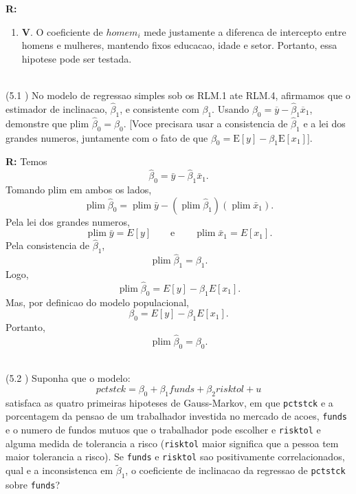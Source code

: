 \documentclass[12pt,letterpaper, onecolumn]{exam}
\DeclareMathOperator*{\plim}{plim}
\renewenvironment{solution}
  {\par\noindent\textbf{R:}\enspace\color{blue}}
  {\par\color{black}}
\begin{document}
\begin{questions}
\begin{solution}
\begin{enumerate}[label=(\arabic*)]
    \item \textbf{V}. O coeficiente de \(homem_i\) mede justamente a diferenca de intercepto entre homens e mulheres, mantendo fixos educacao, idade e setor. Portanto, essa hipotese pode ser testada.
\end{enumerate}
\end{solution}

\
\\

\question\qstar (5.1 \citep{wooldridge2016}) No modelo de regressao simples sob os RLM.1 ate RLM.4, afirmamos que o estimador de inclinacao, $\hat\beta_1$, e consistente com $\beta_1$. Usando $\beta_0 = \overline y - \hat\beta_1\overline x_1$, demonstre que plim $\hat\beta_0 = \beta_0$. [Voce precisara usar a consistencia de $\hat\beta_1$ e a lei dos grandes numeros, juntamente com o fato de que $\beta_0 = \text{E}[y] - \beta_1\text{E}[x_1]$].

\begin{solution}
Temos
\[
\hat\beta_0=\bar y - \hat\beta_1\bar x_1.
\]
Tomando plim em ambos os lados,
\[
\plim \hat\beta_0 = \plim \bar y - (\plim \hat\beta_1)(\plim \bar x_1).
\]
Pela lei dos grandes numeros,
\[
\plim \bar y = E[y]
\qquad \text{e} \qquad
\plim \bar x_1 = E[x_1].
\]
Pela consistencia de \(\hat\beta_1\),
\[
\plim \hat\beta_1 = \beta_1.
\]
Logo,
\[
\plim \hat\beta_0 = E[y] - \beta_1E[x_1].
\]
Mas, por definicao do modelo populacional,
\[
\beta_0 = E[y] - \beta_1E[x_1].
\]
Portanto,
\[
\boxed{\plim \hat\beta_0 = \beta_0.}
\]
\end{solution}

\
\\

\question (5.2 \citep{wooldridge2016}) Suponha que o modelo:
\begin{equation}
    pctstck = \beta_0 + \beta_1funds + \beta_2risktol + u
\end{equation}
satisfaca as quatro primeiras hipoteses de Gauss-Markov, em que \texttt{pctstck} e a porcentagem da pensao de um trabalhador investida no mercado de acoes, \texttt{funds} e o numero de fundos mutuos que o trabalhador pode escolher e \texttt{risktol} e alguma medida de tolerancia a risco (\texttt{risktol} maior significa que a pessoa tem maior tolerancia a risco). Se \texttt{funds} e \texttt{risktol} sao positivamente correlacionados, qual e a inconsistenca em $\tilde\beta_1$, o coeficiente de inclinacao da regressao de \texttt{pctstck} sobre \texttt{funds}?


\end{questions}
\end{document}
